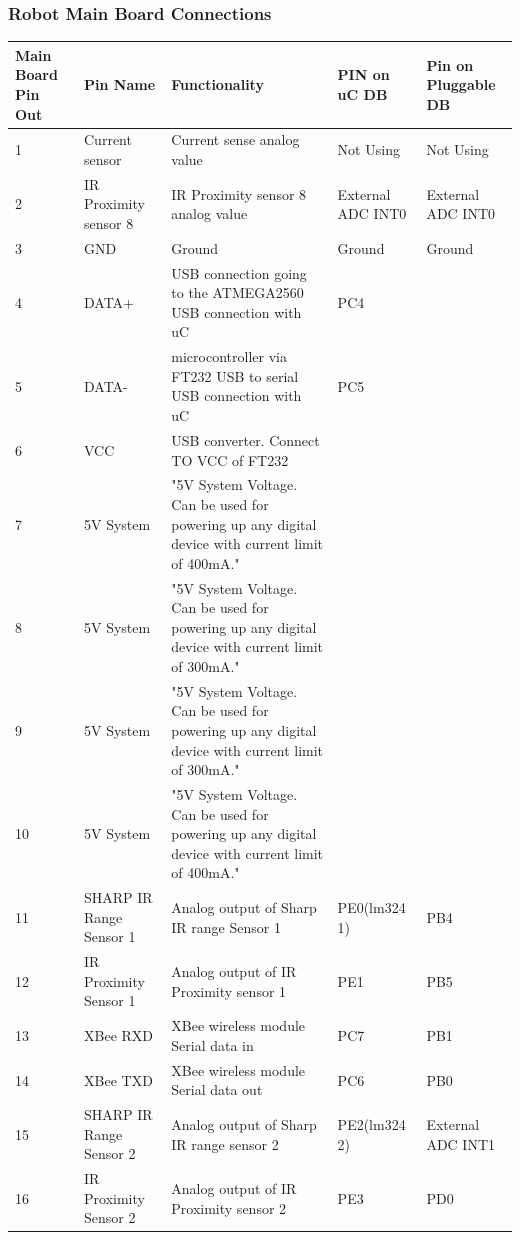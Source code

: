 \documentclass[a4paper,10pt,oneside]{article}
\begin{document}
{		\subsubsection{\textbf{Robot Main Board Connections}}
			\begin{longtable}{|p{}|p{}|p{}|p{.1\textwidth}|p{}|}\hline
				Main Board Pin Out & Pin Name&	Functionality&	PIN on uC DB& Pin on Pluggable DB\\ \hline
				1&	Current sensor&	Current sense analog value&	Not Using & Not Using\\ \hline
				2&	IR Proximity sensor 8&	IR Proximity sensor 8 analog value&	External ADC INT0&	External ADC INT0\\ \hline
				3&	GND&	Ground	&Ground & Ground\\ \hline
				4&	DATA+&	USB connection going to the ATMEGA2560	USB connection with uC & PC4 & \\ \hline
				5&	DATA-&	microcontroller via FT232 USB to serial	USB connection with uC &PC5 & \\ \hline
				6&	VCC& USB	converter.	Connect TO VCC of FT232& &\\ \hline
				7&	5V System&	"5V System Voltage. Can be used for powering
				up any digital device with current limit of
				400mA."	& &\\ \hline
				8&	5V System&	"5V System Voltage. Can be used for powering
				up any digital device with current limit of
				300mA."	& &\\ \hline
				9&	5V System&	"5V System Voltage. Can be used for powering
				up any digital device with current limit of
				300mA."	& &\\ \hline
				10&	5V System&	"5V System Voltage. Can be used for powering
				up any digital device with current limit of
				400mA."	& &\\ \hline
				11&	SHARP IR Range Sensor 1	&Analog output of Sharp IR range Sensor 1&	PE0(lm324 1) & PB4\\ \hline
				12&	IR Proximity Sensor 1&	Analog output of IR Proximity sensor 1&	PE1 & PB5\\ \hline
				13&	XBee RXD&	XBee wireless module Serial data in	&PC7 & PB1\\ \hline
				14&	XBee TXD&	XBee wireless module Serial data out&	PC6 & PB0\\ \hline
				15&	SHARP IR Range Sensor 2	& Analog output of Sharp IR range sensor 2&	PE2(lm324 2) & External ADC INT1\\ \hline
				16&	IR Proximity Sensor 2&	Analog output of IR Proximity sensor 2&	PE3 & PD0\\ \hline

\end{longtable}}
\end{document}
